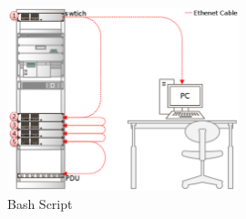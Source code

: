 \documentclass[11pt
  , a4paper
  , article
  , oneside
]{memoir}
\begin{document}
\begin{figure}[!htb]
  \centering
  \includegraphics[width=0.6\textwidth]{./images/switch5.eps}
  \caption{Bash Script }
  \label{fig:switch}   
\end{figure}
\end{document}
